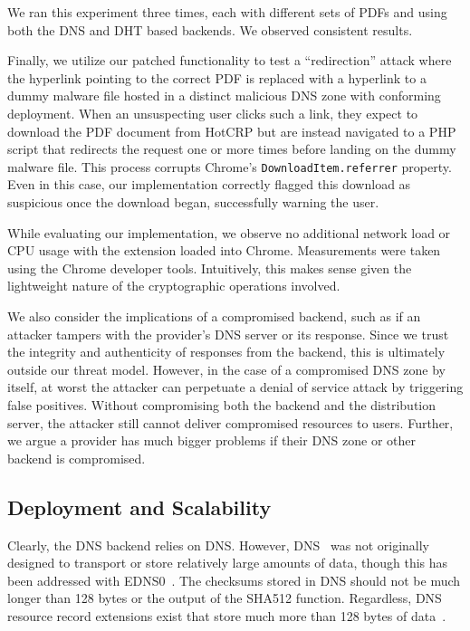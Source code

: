 We ran this experiment three times, each with different sets of PDFs and using
both the DNS and DHT based backends. We observed consistent results.

Finally, we utilize our patched functionality to test a ``redirection'' attack
where the hyperlink pointing to the correct PDF is replaced with a hyperlink to
a dummy malware file hosted in a distinct malicious DNS zone with conforming
\SYSTEM{} deployment. When an unsuspecting user clicks such a link, they expect
to download the PDF document from HotCRP but are instead navigated to a PHP
script that redirects the request one or more times before landing on the dummy
malware file. This process corrupts Chrome's \texttt{DownloadItem.referrer}
property. Even in this case, our implementation correctly flagged this download
as suspicious once the download began, successfully warning the user.

While evaluating our implementation, we observe no additional network load or
CPU usage with the extension loaded into Chrome. Measurements were taken using
the Chrome developer tools. Intuitively, this makes sense given the lightweight
nature of the cryptographic operations involved.

We also consider the implications of a compromised backend, such as if an
attacker tampers with the provider's DNS server or its response. Since we trust
the integrity and authenticity of responses from the backend, this is ultimately
outside our threat model. However, in the case of a compromised DNS zone by
itself, at worst the attacker can perpetuate a denial of service attack by
triggering false positives. Without compromising both the backend and the
distribution server, the attacker still cannot deliver compromised resources to
users. Further, we argue a provider has much bigger problems if their DNS zone
or other backend is compromised.

\subsection{Deployment and Scalability}


Clearly, the DNS backend relies on DNS. However, DNS~\cite{DNS1} was not
originally designed to transport or store relatively large amounts of data,
though this has been addressed with EDNS0~\cite{EDNS}. The checksums stored in
DNS should not be much longer than 128 bytes or the output of the SHA512
function. Regardless, DNS resource record extensions exist that store much more
than 128 bytes of data~\cite{CERT, IPSECKEY, DANE3, DANE1}.

